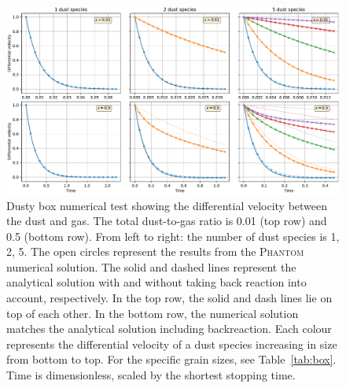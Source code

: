 \documentclass[fleqn,usenatbib]{mnras}
\begin{document}
\begin{figure}
   \begin{center}
      \includegraphics[width=\textwidth]{figs/dustybox_differential_velocity_comparison.pdf}
      \caption{Dusty box numerical test showing the differential velocity
         between the dust and gas. The total dust-to-gas ratio is 0.01 (top row)
         and 0.5 (bottom row). From left to right: the number of dust species is
         1, 2, 5. The open circles represent the results from the
         \textsc{Phantom} numerical solution. The solid and dashed lines
         represent the analytical solution with and without taking back reaction
         into account, respectively. In the top row, the solid and dash lines
         lie on top of each other. In the bottom row, the numerical solution
         matches the analytical solution including backreaction. Each colour
         represents the differential velocity of a dust species increasing in
         size from bottom to top. For the specific grain sizes, see
         Table~\ref{tab:box}. Time is dimensionless, scaled by the shortest
         stopping time.%
         \label{fig:dustybox}}
   \end{center}
\end{figure}
\end{document}
